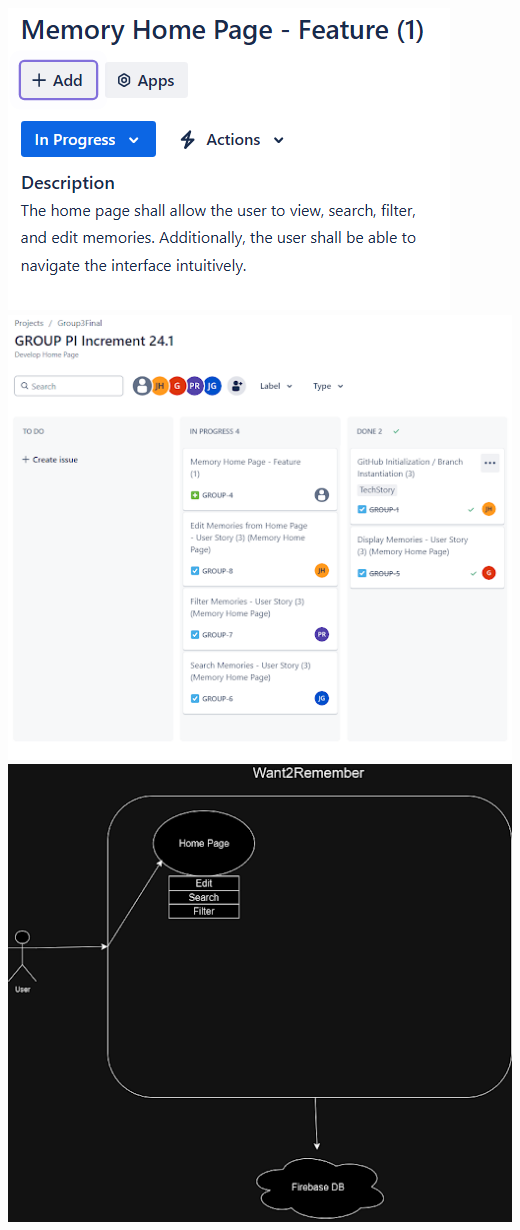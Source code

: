 \documentclass[12pt]{article}
\begin{document}
\includegraphics{snapshot1img1.png}\newline
\includegraphics{snapshot1img2.png}
\includegraphics{snapshot1img3.png}
\end{document}
